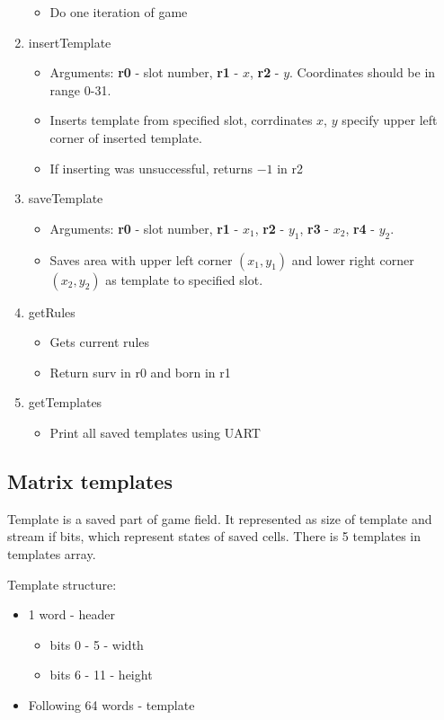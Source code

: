 \begin{enumerate}
\begin{itemize}
			\item Do one iteration of game
		\end{itemize}
	\item insertTemplate
		\begin{itemize}
			\item Arguments: \textbf{r0} - slot number, \textbf{r1} - $x$, \textbf{r2} - $y$. Coordinates should be in range 0-31.
			\item Inserts template from specified slot, corrdinates $x$, $y$ specify upper left corner of inserted template.
			\item If inserting was unsuccessful, returns $-1$ in r2
		\end{itemize}
	\item saveTemplate
		\begin{itemize}
			\item Arguments: \textbf{r0} - slot number, \textbf{r1} - $x_{1}$, \textbf{r2} - $y_{1}$, \textbf{r3} - $x_{2}$, \textbf{r4} - $y_{2}$.
			\item Saves area with upper left corner $(x_{1}, y_{1})$ and lower right corner $(x_{2}, y_{2})$ as template to specified slot.
		\end{itemize}
	\item getRules
		\begin{itemize}
			\item Gets current rules
			\item Return surv in r0 and born in r1
		\end{itemize}
	\item getTemplates
		\begin{itemize}
			\item Print all saved templates using UART
		\end{itemize}
\end{enumerate}

\subsection*{Matrix templates}

Template is a saved part of game field. It represented as size of template and stream if bits, which represent states of saved cells. There is 5 templates in templates array.

Template structure:

\begin{itemize}
	\item 1 word - header
		\begin{itemize}
			\item bits 0 - 5 - width
			\item bits 6 - 11 - height
		\end{itemize}
	\item Following 64 words - template
\end{itemize}

